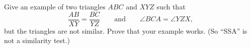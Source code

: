 Give an example of two triangles $ABC$ and $XYZ$ such that
\[\dfrac{AB}{XY}=\dfrac{BC}{YZ}\qquad\text{and}\qquad\angle BCA=\angle YZX,\]
but the triangles are not similar. Prove that your example works. (So ``SSA'' is not a similarity test.)

